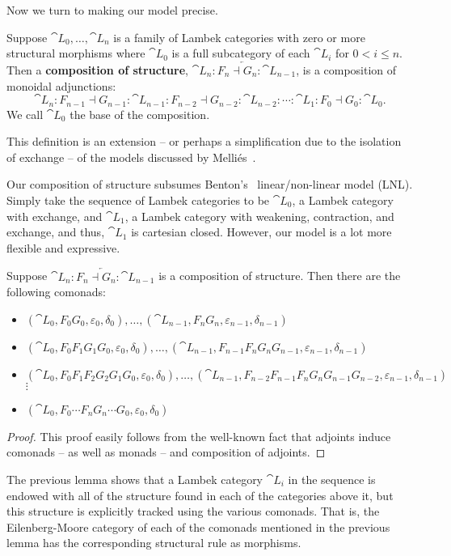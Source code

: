 Now we turn to making our model precise.
\begin{definition}
  \label{def:model}  
  Suppose $\cat{L}_0, \ldots, \cat{L}_n$ is a family of Lambek
  categories with zero or more structural morphisms where $\cat{L}_0$
  is a full subcategory of each $\cat{L}_{i}$ for $0 < i \leq n$.  Then a \textbf{composition of structure},
  $\overleftarrow{\cat{L}_n : F_n \dashv G_n : \cat{L}_{n-1}}$, is a composition of monoidal adjunctions:
  \[ \cat{L}_n : F_{n-1} \dashv G_{n-1} : \cat{L}_{n-1} : F_{n-2} \dashv G_{n-2} : \cat{L}_{n-2} : \cdots : \cat{L}_1 : F_0 \dashv G_0 : \cat{L}_0. \]
  We call $\cat{L}_0$ the base of the composition.
\end{definition}
This definition is an extension -- or perhaps a simplification due to
the isolation of exchange -- of the models discussed by
Melli\'es~\cite{MELLIES2004202}.

Our composition of structure subsumes Benton's~\cite{Benton:1994}
linear/non-linear model (LNL).  Simply take the sequence of Lambek
categories to be $\cat{L}_0$, a Lambek category with exchange, and
$\cat{L}_1$, a Lambek category with weakening, contraction, and
exchange, and thus, $\cat{L}_1$ is cartesian closed.  However, our
model is a lot more flexible and expressive.

\begin{lemma}
  \label{lemma:comonads_in_a_composition_of_structure}
  Suppose $\overleftarrow{\cat{L}_n : F_n \dashv G_n : \cat{L}_{n-1}}$ is a composition of structure.  Then
  there are the following comonads:  
  \begin{itemize}
  \item $(\cat{L}_0, F_0G_0, \varepsilon_0, \delta_0), \ldots, (\cat{L}_{n-1}, F_nG_n, \varepsilon_{n-1}, \delta_{n-1})$
  \item $(\cat{L}_0, F_0F_1G_1G_0, \varepsilon_0, \delta_0), \ldots, (\cat{L}_{n-1}, F_{n-1}F_nG_nG_{n-1}, \varepsilon_{n-1}, \delta_{n-1})$
  \item $(\cat{L}_0, F_0F_1F_2G_2G_1G_0, \varepsilon_0, \delta_0), \ldots, (\cat{L}_{n-1}, F_{n-2}F_{n-1}F_nG_nG_{n-1}G_{n-2}, \varepsilon_{n-1}, \delta_{n-1})$\\
    $\vdots$
  \item $(\cat{L}_0, F_0 \cdots F_nG_n \cdots G_0, \varepsilon_0, \delta_0)$
  \end{itemize} 
\end{lemma}
\begin{proof}
  This proof easily follows from the well-known fact that adjoints
  induce comonads -- as well as monads -- and composition of adjoints.
\end{proof}
The previous lemma shows that a Lambek category $\cat{L}_i$ in the
sequence is endowed with all of the structure found in each of the
categories above it, but this structure is explicitly tracked using
the various comonads.  That is, the Eilenberg-Moore category of each of the
comonads mentioned in the previous lemma has the corresponding
structural rule as morphisms.

